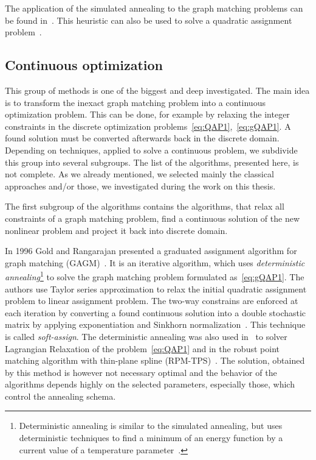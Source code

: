 The application of the simulated annealing to the graph matching problems can be found in~\cite{Herault1990_SimulatedAnnealing}. This heuristic can also be used to solve a quadratic assignment problem~\cite{Burkard98thequadratic}.
\subsection{Continuous optimization}
This group of methods is one of the biggest and deep investigated. The main idea is to transform the inexact graph matching problem into a continuous optimization problem. This can be done, for example by relaxing the integer constraints in the discrete optimization problems~\eqref{eq:QAP1},~\eqref{eq:gQAP1}. A found solution must be converted afterwards back in the discrete domain. Depending on techniques, applied to solve a continuous problem, we subdivide this group into several subgroups. The list of the algorithms, presented here, is not complete. As we already mentioned, we selected mainly the classical approaches and/or those, we investigated during the work on this thesis.

The first subgroup of the algorithms contains the algorithms, that relax all constraints of a graph matching problem, find a continuous solution of the new nonlinear problem and project it back into discrete domain. 

In 1996 Gold and Rangarajan presented a graduated assignment algorithm for graph matching (GAGM)~\cite{Rangarajan1996_GAGM}. It is an iterative algorithm, which uses \emph{deterministic annealing}\footnote{Deterministic annealing is similar to the simulated annealing, but uses deterministic techniques to find a minimum of an energy function by a current value of a temperature parameter~\cite{Rose1991_DA}.} to solve the graph matching problem formulated as~\eqref{eq:gQAP1}. The authors use Taylor series approximation to relax the initial quadratic assignment problem to linear assignment problem. The two-way constrains are enforced at each iteration by converting a  found continuous solution into a double stochastic matrix by applying exponentiation and Sinkhorn normalization~\cite{Sinkhorn1964}. This technique is called \emph{soft-assign}. The deterministic annealing was also used in~\cite{Rangarajan96_LagRelax} to solver Lagrangian Relaxation of the problem~\eqref{eq:QAP1} and in the robust point matching algorithm with thin-plane spline (RPM-TPS)~\cite{Chui2003}. The solution, obtained by this method is however not necessary optimal and the behavior of the algorithms depends highly on the selected parameters, especially those, which control the annealing schema.


